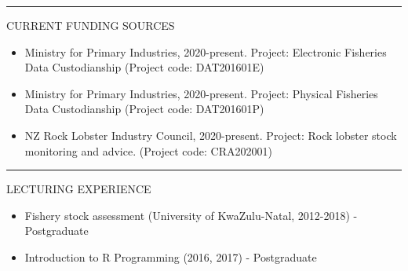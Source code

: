 \documentclass[10pt,a4paper]{article}
\begin{document}
\hrule
\vspace{6pt}
\noindent


\noindent
CURRENT FUNDING SOURCES
	\begin{itemize}
	\setlength\itemsep{0.05em}
	\item Ministry for Primary Industries, 2020-present. Project: Electronic Fisheries Data Custodianship (Project code: DAT201601E)  
	\item Ministry for Primary Industries, 2020-present. Project: Physical Fisheries Data Custodianship (Project code: DAT201601P)  
	\item NZ Rock Lobster Industry Council, 2020-present. Project: Rock lobster stock monitoring and advice. (Project code: CRA202001)
	\end{itemize}
\hrule	
\vspace{6pt}
\noindent
LECTURING EXPERIENCE
	\begin{itemize}
		\setlength\itemsep{0.05em}
		\item Fishery stock assessment (University of KwaZulu-Natal, 2012-2018) - Postgraduate
		\item Introduction to R Programming (2016, 2017) - Postgraduate
	\end{itemize}
\end{document}

